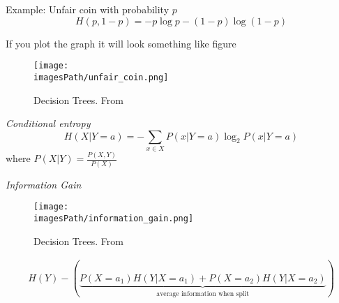 \begin{multicols}{2}
\begin{exampleblock}{Example: Unfair coin with probability $p$}
   \begin{equation*}
       H(p, 1-p) = -p\log p -(1-p)\log(1-p)
   \end{equation*} 

   If you plot the graph it will look something like figure 
\end{exampleblock}
\begin{figure}[H]
    \centering
    \texttt{[image: \\imagesPath/unfair\_coin.png]}
    \caption{Decision Trees. From \cite{iml}}
\end{figure}

\textit{Conditional entropy}
\begin{equation*}
    H(X|Y=a) = -\sum_{x\in X}P(x|Y=a)\log_2 P(x|Y=a)
\end{equation*}
where $P(X|Y) = \frac{P(X,Y)}{P(X)}$

\textit{Information Gain}
\begin{figure}[H]
    \centering
    \texttt{[image: \\imagesPath/information\_gain.png]}
    \caption{Decision Trees. From \cite{iml}}
\end{figure}

\begin{align*}
    H(Y) - \left( \underbrace{P(X=a_1)H(Y|X=a_1) + P(X=a_2)H(Y|X=a_2)}_{\text{average information when split}} \right)
\end{align*}
\end{multicols}
\raggedcolumns


